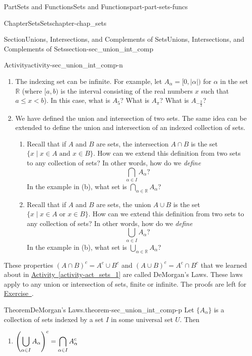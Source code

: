 \documentclass[oneside,10pt,]{book}
\newcommand{\xreffont}{\relax}
\numberwithin{equation}{chapter}
\newcommand{\R}{\mathbb{R}}
\newcommand{\ds}{\displaystyle}
\newcommand{\lt}{<}
\begin{document}
\begin{partptx}{Part}{Sets and Functions}{}{Sets and Functions}{}{}{part-part-sets-funcs}
\begin{chapterptx}{Chapter}{Sets}{}{Sets}{}{}{chapter-chap_sets}
\begin{sectionptx}{Section}{Unions, Intersections, and Complements of Sets}{}{Unions, Intersections, and Complements of Sets}{}{}{section-sec_union_int_comp}
\begin{activity}{Activity}{}{activity-sec_union_int_comp-n}
\begin{enumerate}[font=\bfseries,label=(\alph*),ref=\alph*]
\begin{enumerate}[font=\bfseries,label=(\roman*),ref=\theenumi.\roman*]
\end{enumerate}%
\item{}The indexing set can be infinite. For example, let \(A_{\alpha} = [0, |\alpha|)\) for \(\alpha\) in the set \(\R\) (where \([a,b)\) is the interval consisting of the real numbers \(x\) such that \(a \leq x \lt b\)). In this case, what is \(A_5\)? What is \(A_{\pi}\)? What is \(A_{-\frac{2}{3}}\)?%
\item{}We have defined the union and intersection of two sets. The same idea can be extended to define the union and intersection of an indexed collection of sets.%
\begin{enumerate}[font=\bfseries,label=(\roman*),ref=\theenumi.\roman*]%
\item{}Recall that if \(A\) and \(B\) are sets, the intersection \(A \cap B\) is the set \(\{x \mid x \in A \text{ and }  x \in B\}\). How can we extend this definition from two sets to any collection of sets? In other words, how do we \emph{define}%
\begin{equation*}
\bigcap_{\alpha \in I} A_{\alpha}?
\end{equation*}
In the example in (b), what set is \(\ds \bigcap_{\alpha \in \R} A_{\alpha}\)?%
\item{}Recall that if \(A\) and \(B\) are sets, the union \(A \cup B\) is the set \(\{x \mid x \in A \text{ or }  x \in B\}\). How can we extend this definition from two sets to any collection of sets? In other words, how do we \emph{define}%
\begin{equation*}
\bigcup_{\alpha \in I} A_{\alpha}?
\end{equation*}
In the example in (b), what set is \(\ds \bigcup_{\alpha \in \R} A_{\alpha}\)?%
\end{enumerate}%
\end{enumerate}%
\end{activity}%
These properties \((A \cap B)^c = A^c \cup B^c\) and \((A \cup B)^c = A^c \cap B^c\) that we learned about in \hyperref[activity-act_sets_1]{Activity~{\xreffont\ref{activity-act_sets_1}}} are called DeMorgan's Laws. These laws apply to any union or intersection of sets, finite or infinite. The proofs are left for \hyperlink{exercise-ex_DeMorgan}{Exercise~{\xreffont 4}}.%
\begin{theorem}{Theorem}{DeMorgan's Laws.}{}{theorem-sec_union_int_comp-p}%
Let \(\{A_{\alpha}\}\) is a collection of sets indexed by a set \(I\) in some universal set \(U\). Then%
\begin{enumerate}
\item{}\(\displaystyle \displaystyle \left(\bigcup_{\alpha \in I} A_{\alpha}\right)^c = \bigcap_{\alpha \in I} A_{\alpha}^c\)%

\end{enumerate}
\end{theorem}
\end{sectionptx}
\end{chapterptx}
\end{partptx}
\end{document}
